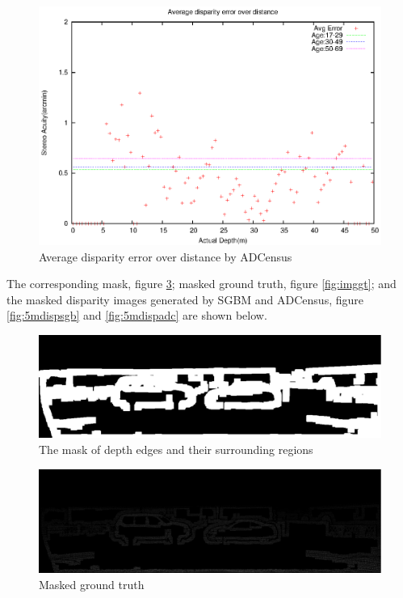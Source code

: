\begin{figure}[H]
\centering
\includegraphics[scale=0.8]{adcimg5pix3msk}
\caption{Average disparity error over distance by ADCensus}
\label{fig:imgfull}
\end{figure}

\noindent
The corresponding mask, figure \ref{fig:imgmsk}; masked ground truth, figure \ref{fig:imggt}; and
the masked disparity images generated by SGBM and ADCensus, figure \ref{fig:5mdispsgb} and \ref{fig:5mdispadc} 
are shown below.

\begin{figure}[H]
\centering
\includegraphics[scale=0.35]{5msk}
\caption{The mask of depth edges and their surrounding regions}
\label{fig:imgmsk}
\end{figure} 

\begin{figure}[H]
\centering
\includegraphics[scale=0.35]{5gt}
\caption{Masked ground truth}
\label{fig:imgmsk}
\end{figure} 

